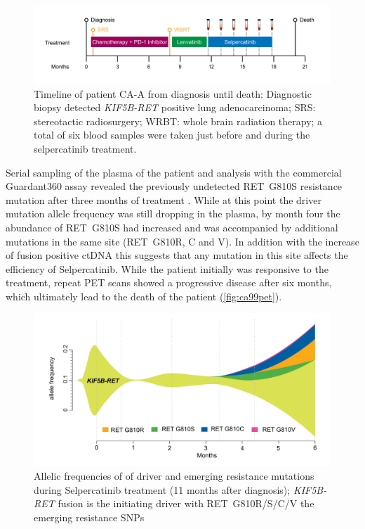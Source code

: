 \begin{figure}[ht]
\centering
\includegraphics[width=.99\linewidth]{Figures/CASCADE/CA99/CA-A_timeline}
\caption[Timeline of patient CA-A from diagnosis until death]{Timeline of patient CA-A from diagnosis until death: Diagnostic biopsy detected \textit{KIF5B-RET} positive lung adenocarcinoma; SRS: stereotactic radiosurgery; WRBT: whole brain radiation therapy; a total of six blood samples were taken just before and during the selpercatinib treatment.} \label{fig:ca99timeline}
\end{figure}


Serial sampling of the plasma of the patient and analysis with the commercial Guardant360 assay \cite{Talasaz2014} revealed the previously undetected RET~G810S resistance mutation after three months of treatment . While at this point the driver mutation allele frequency was still dropping in the plasma, by month four the abundance of RET~G810S had increased and was accompanied by additional mutations in the same site (RET~G810R, C and V). In addition with the increase of fusion positive ctDNA this suggests that any mutation in this site affects the efficiency of Selpercatinib. While the patient initially was responsive to the treatment, repeat PET scans showed a progressive disease after six months, which ultimately lead to the death of the patient (\autoref{fig:ca99pet}).

\begin{figure}[ht]
\centering
\includegraphics[width=.99\linewidth]{Figures/CASCADE/CA99/CA-A_ctDNAstream}
\caption[Allelic frequencies of of driver and emerging resistance mutations]{Allelic frequencies of of driver and emerging resistance mutations during Selpercatinib treatment (11 months after diagnosis); \textit{KIF5B-RET} fusion is the initiating driver with RET~G810R/S/C/V the emerging resistance SNPs} \label{fig:ca99ctDNA}
\end{figure}


